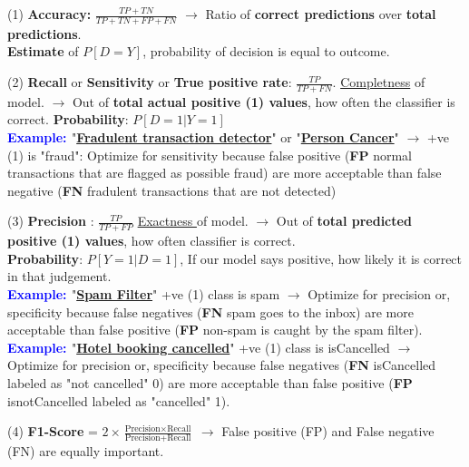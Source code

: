 \documentclass[letterpaper, 10.5pt,landscape]{article}
\begin{document}
\begin{multicols*}{3}
(1) \textbf{Accuracy: } $\boxed{\frac{TP + TN}{TP + TN + FP + FN}}$ $\rightarrow$ Ratio of \textbf{correct predictions} over \textbf{total predictions}. \\
    \textbf{Estimate} of $\boxed{P[D=Y]}$,  probability of decision is equal to outcome.

\vspace{2pt}

(2) \textbf{Recall} or \textbf{Sensitivity} or \textbf{True positive rate}: $\boxed{\frac{TP}{TP+FN}}$.  \underline{Completness} of model. $\rightarrow$ Out of \textbf{total actual positive (1) values}, how often the classifier is correct. \textbf{Probability}: $\boxed{P[D=1 | Y=1]}$ \\
    \textbf{\textcolor{blue}{Example: }} "\underline{\textbf{Fradulent transaction detector}}" or "\underline{\textbf{Person Cancer}}" $\rightarrow$ +ve (1) is "fraud": Optimize for sensitivity because false positive (\textbf{FP} normal transactions that are flagged as possible fraud) are more acceptable than false negative (\textbf{FN} fradulent transactions that are not detected) 

\vspace{2pt}

 (3) \textbf{Precision} : $\boxed{\frac{TP}{TP+FP}}$ \underline{Exactness } of model. $\rightarrow$ Out of \textbf{total predicted positive (1) values}, how often classifier is correct. \\ \textbf{Probability}: $\boxed{P[Y=1 | D=1]}$, If our model says positive, how likely it is correct in that judgement.\\
    \textbf{\textcolor{blue}{Example: }} "\underline{\textbf{Spam Filter}}" +ve (1) class is spam $\rightarrow$ Optimize for precision or, specificity because false negatives (\textbf{FN} spam goes to the inbox) are more acceptable than false positive (\textbf{FP} non-spam is caught by the spam filter).
    \textbf{\textcolor{blue}{Example: }} "\underline{\textbf{Hotel booking cancelled}}" +ve (1) class is isCancelled $\rightarrow$ Optimize for precision or, specificity because false negatives (\textbf{FN} isCancelled labeled as "not cancelled" 0) are more acceptable than false positive (\textbf{FP} isnotCancelled labeled as "cancelled" 1).

\vspace{2pt}
(4) \textbf{F1-Score } = $\boxed{2 \times \frac{\text{Precision} \times \text{Recall}}{\text{Precision} + \text{Recall}}}$  $\rightarrow$ False positive (FP) and False negative (FN) are equally important.
\vspace{2pt}


\end{multicols*}
\end{document}
